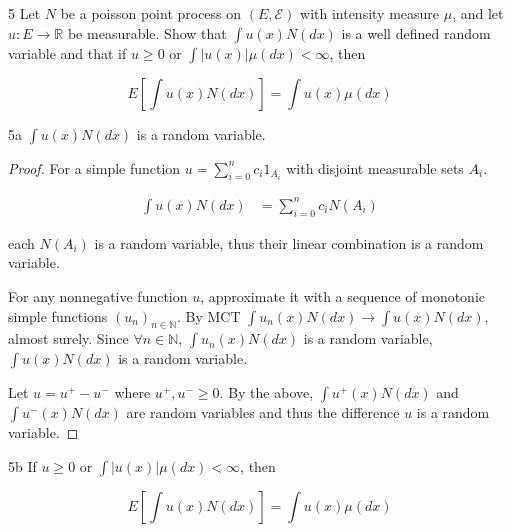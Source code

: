\documentclass{article}
\newcommand{\R}{\mathbb{R}}
\newcommand{\N}{\mathbb{N}}
\newcommand{\abs}[1]{\left\lvert #1\right\rvert}
\newcommand{\Ec}[0]{\mathcal{E}}
\begin{document}
\begin{PROB}{5}\label{Problem 5.}
    Let $N$ be a poisson point process on $(E, \Ec)$ with intensity measure $\mu$, and let $u: E \to \R$ be measurable. Show that $\int u(x) N(dx)$ is a well defined random variable and that if $u \geq 0$ or $\int \abs{u(x)} \mu(dx) < \infty$, then 
    
    \[E\left[\int u(x) N(dx)\right] = \int u(x) \mu(dx) \]
\end{PROB}
\begin{claim}{5a}\label{Claim 5a.}
    $\int u(x) N(dx)$ is a random variable.  
\end{claim}
\begin{proof}
    For a simple function $u = \sum_{i = 0}^n c_i 1_{A_i}$ with disjoint measurable sets $A_i$. 
    
    \begin{align*}
        \int u(x) N(dx) &= \sum_{i = 0}^n c_i N(A_i)
    \end{align*}

    each $N(A_i)$ is a random variable, thus their linear combination is a random variable. 
    
    For any nonnegative function $u$, approximate it with a sequence of monotonic simple functions $(u_n)_{n \in \N}$. By MCT $\int u_n(x) N(dx) \to \int u(x) N(dx)$, almost surely. Since $\forall n \in \N$, $\int u_n(x) N(dx)$ is a random variable, $\int u(x) N(dx)$ is a random variable. 
    
    Let $u  = u^+ - u^-$ where $u^+, u^- \geq 0$. By the above, $\int u^+(x) N(dx)$ and $\int u^-(x) N(dx)$ are random variables and thus the difference $u$ is a random variable. 
\end{proof}
\begin{claim}{5b}\label{Claim 5b.}
    If $u \geq 0$ or $\int \abs{u(x)} \mu(dx) < \infty$, then 
    
    \[E\left[\int u(x) N(dx)\right] = \int u(x) \mu(dx) \]
\end{claim}
\end{document}
